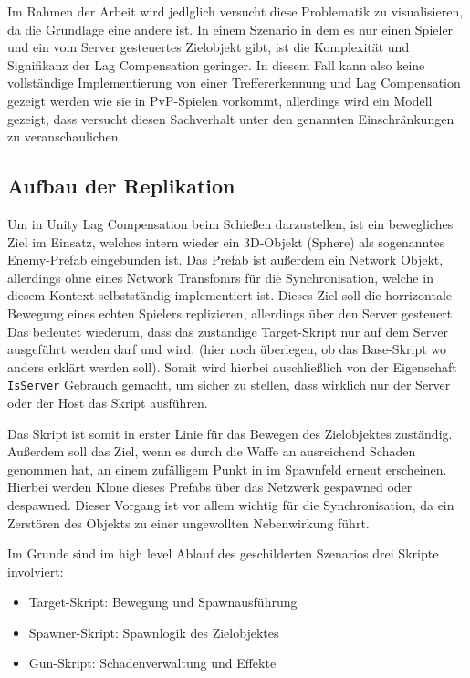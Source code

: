\begin{enumerate}
Im Rahmen der Arbeit wird jedlglich versucht diese Problematik zu visualisieren, da die Grundlage eine andere ist. In einem Szenario in dem es nur einen Spieler und ein vom Server gesteuertes Zielobjekt gibt, ist die Komplexität und Signifikanz der Lag Compensation geringer.
In diesem Fall kann also keine vollständige Implementierung von einer Treffererkennung und Lag Compensation gezeigt werden wie sie in PvP-Spielen vorkommt, allerdings wird ein Modell gezeigt, dass versucht diesen Sachverhalt unter den genannten Einschränkungen zu veranschaulichen. 


\subsection{Aufbau der Replikation}
Um in Unity Lag Compensation beim Schießen darzustellen, ist ein bewegliches Ziel im Einsatz, welches intern wieder ein 3D-Objekt (Sphere) als sogenanntes Enemy-Prefab eingebunden ist. Das Prefab ist außerdem ein Network Objekt, allerdings ohne eines Network Transfomrs für die Synchronisation, welche in diesem Kontext selbstständig implementiert ist. Dieses Ziel soll die horrizontale Bewegung eines echten Spielers replizieren, allerdings über den Server gesteuert. Das bedeutet wiederum, dass das zuständige Target-Skript nur auf dem Server ausgeführt werden darf und wird.
(hier noch überlegen, ob das Base-Skript wo anders erklärt werden soll).
Somit wird hierbei auschließlich von der Eigenschaft \texttt{IsServer} Gebrauch gemacht, um sicher zu stellen, dass wirklich nur der Server oder der Host das Skript ausführen.

Das Skript ist somit in erster Linie für das Bewegen des Zielobjektes zuständig. Außerdem soll das Ziel, wenn es durch die Waffe an ausreichend Schaden genommen hat, an einem zufälligem Punkt in im Spawnfeld erneut erscheinen.
Hierbei werden Klone dieses Prefabs über das Netzwerk gespawned oder despawned. Dieser Vorgang ist vor allem wichtig für die Synchronisation, da ein Zerstören des Objekts zu einer ungewollten Nebenwirkung führt.

Im Grunde sind im high level Ablauf des geschilderten Szenarios drei Skripte involviert: 
\begin{itemize}
    \item Target-Skript: Bewegung und Spawnausführung
    \item Spawner-Skript: Spawnlogik des Zielobjektes
    \item Gun-Skript: Schadenverwaltung und Effekte
\end{itemize}


\end{enumerate}
